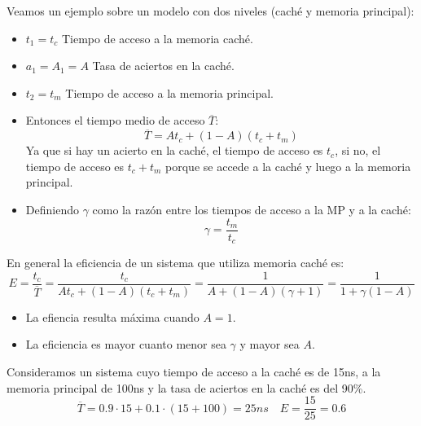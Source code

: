 \begin{ejemplo}
    Veamos un ejemplo sobre un modelo con dos niveles (caché y memoria principal):
    \begin{itemize}
        \item $t_1 = t_c$ Tiempo de acceso a la memoria caché.
        \item $a_1 = A_1 = A$ Tasa de aciertos en la caché.
        \item $t_2 = t_m$ Tiempo de acceso a la memoria principal.
        \item Entonces el tiempo medio de acceso $\overline{T}$:
            \begin{equation*}
                \overline{T} = At_c + (1-A)(t_c + t_m)
            \end{equation*}
        Ya que si hay un acierto en la caché, el tiempo de acceso es $t_c$, si no, el tiempo de acceso es $t_c + t_m$ porque se accede a la caché y luego a la memoria principal.
    \item Definiendo $\gamma$ como la razón entre los tiempos de acceso a la MP y a la caché:
        \begin{equation*}
            \gamma = \frac{t_m}{t_c}
        \end{equation*}
    \end{itemize}
\end{ejemplo}
En general la eficiencia de un sistema que utiliza memoria caché es:
\begin{equation*}
    E = \frac{t_c}{\overline{T}} = \frac{t_c}{At_c + (1-A)(t_c + t_m)} = \frac{1}{A + (1-A)(\gamma +1)} = \frac{1}{1 + \gamma(1-A)}
\end{equation*}
\begin{itemize}
    \item La efiencia resulta máxima cuando $A = 1$.
    \item La eficiencia es mayor cuanto menor sea $\gamma$ y mayor sea $A$.
\end{itemize}
\begin{ejemplo}
    Consideramos un sistema cuyo tiempo de acceso a la caché es de 15ns, a la memoria principal de 100ns y la tasa de aciertos en la caché es del 90\%.
    \begin{equation*}
        \overline{T} = 0.9 \cdot 15 + 0.1 \cdot (15 + 100) = 25ns \quad E = \frac{15}{25} = 0.6
    \end{equation*}
\end{ejemplo}

